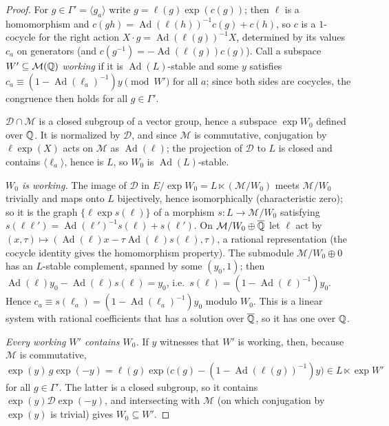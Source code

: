 \begin{proof}
For $g\in\Gamma'=\langle g_a\rangle$ write $g=\ell(g)\exp(c(g))$; then $\ell$ is a homomorphism and
$c(gh)=\operatorname{Ad}(\ell(h))^{-1}c(g)+c(h)$, so $c$ is a $1$-cocycle for the right action
$X\cdot g=\operatorname{Ad}(\ell(g))^{-1}X$, determined by its values $c_a$ on generators (and
$c(g^{-1})=-\operatorname{Ad}(\ell(g))c(g)$). Call a subspace $W'\subseteq\mathcal M(\mathbb{Q})$ \emph{working}
if it is $\operatorname{Ad}(L)$-stable and some $y$ satisfies
$c_a\equiv(1-\operatorname{Ad}(\ell_a)^{-1})y\pmod{W'}$ for all $a$; since both sides are cocycles,
the congruence then holds for all $g\in\Gamma'$.

$\mathcal D\cap\mathcal M$ is a closed subgroup of a vector group, hence a subspace $\exp W_0$ defined
over $\mathbb{Q}$. It is normalized by $\mathcal D$, and since $\mathcal M$ is commutative, conjugation by
$\ell\exp(X)$ acts on $\mathcal M$ as $\operatorname{Ad}(\ell)$; the projection of $\mathcal D$ to $L$ is
closed and contains $\langle\ell_a\rangle$, hence is $L$, so $W_0$ is $\operatorname{Ad}(L)$-stable.

\emph{$W_0$ is working.} The image of $\mathcal D$ in $E/\exp W_0=L\ltimes(\mathcal M/W_0)$ meets
$\mathcal M/W_0$ trivially and maps onto $L$ bijectively, hence isomorphically (characteristic zero);
so it is the graph $\{\ell\exp s(\ell)\}$ of a morphism $s:L\to\mathcal M/W_0$ satisfying
$s(\ell\ell')=\operatorname{Ad}(\ell')^{-1}s(\ell)+s(\ell')$. On $\mathcal M/W_0\oplus\overline{\mathbb{Q}}$ let
$\ell$ act by $(x,\tau)\mapsto(\operatorname{Ad}(\ell)x-\tau\operatorname{Ad}(\ell)s(\ell),\tau)$,
a rational representation (the cocycle identity gives the homomorphism property). The
submodule $\mathcal M/W_0\oplus0$ has an $L$-stable complement, spanned by some $(y_0,1)$; then
$\operatorname{Ad}(\ell)y_0-\operatorname{Ad}(\ell)s(\ell)=y_0$, i.e.\
$s(\ell)=(1-\operatorname{Ad}(\ell)^{-1})y_0$. Hence
$c_a\equiv s(\ell_a)=(1-\operatorname{Ad}(\ell_a)^{-1})y_0$ modulo $W_0$. This is a linear system with
rational coefficients that has a solution over $\overline{\mathbb{Q}}$, so it has one over $\mathbb{Q}$.

\emph{Every working $W'$ contains $W_0$.} If $y$ witnesses that $W'$ is working, then, because
$\mathcal M$ is commutative,
$\exp(y)\,g\exp(-y)=\ell(g)\exp\bigl(c(g)-(1-\operatorname{Ad}(\ell(g))^{-1})y\bigr)\in L\ltimes\exp W'$
for all $g\in\Gamma'$. The latter is a closed subgroup, so it contains $\exp(y)\mathcal D\exp(-y)$,
and intersecting with $\mathcal M$ (on which conjugation by $\exp(y)$ is trivial) gives
$W_0\subseteq W'$.


\end{proof}
